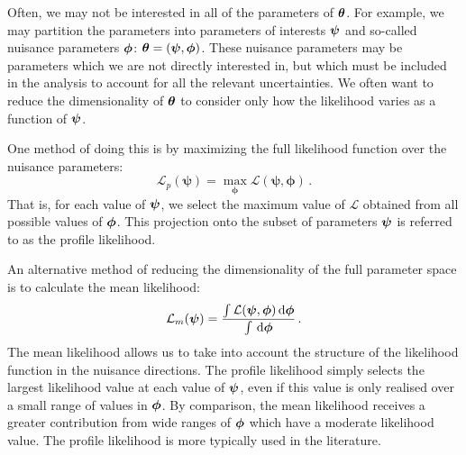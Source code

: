 Often, we may not be interested in all of the parameters of $\boldsymbol\theta$. For example, we may partition the parameters into parameters of interests $\boldsymbol\psi$ and so-called nuisance parameters $\boldsymbol\phi$: $\boldsymbol\theta = (\boldsymbol\psi, \boldsymbol\phi)$. These nuisance parameters may be parameters which we are not directly interested in, but which must be included in the analysis to account for all the relevant uncertainties. We often want to reduce the dimensionality of $\boldsymbol\theta$ to consider only how the likelihood varies as a function of $\boldsymbol\psi$.

One method of doing this is by maximizing the full likelihood function over the nuisance parameters:
\begin{equation}
\label{eq:parameter:profilelikelihood}
\mathcal{L}_p(\boldsymbol{\psi}) = \max_{\boldsymbol{\phi}} \mathcal{L}(\boldsymbol{\psi},\boldsymbol{\phi})\,.
\end{equation}
That is, for each value of $\boldsymbol\psi$, we select the maximum value of $\mathcal{L}$ obtained from all possible values of $\boldsymbol\phi$. This projection onto the subset of parameters $\boldsymbol\psi$ is referred to as the profile likelihood.

An alternative method of reducing the dimensionality of the full parameter space is to calculate the mean likelihood:
\begin{equation}
\label{eq:parameter:meanlikelihood}
\mathcal{L}_m(\boldsymbol{\psi}) = \frac{\int \mathcal{L}(\boldsymbol\psi, \boldsymbol\phi) \, \mathrm{d}\boldsymbol\phi}{\int \, \mathrm{d}\boldsymbol\phi}\,.
\end{equation}
The mean likelihood allows us to take into account the structure of the likelihood function in the nuisance directions. The profile likelihood simply selects the largest likelihood value at each value of $\boldsymbol\psi$, even if this value is only realised over a small range of values in $\boldsymbol\phi$. By comparison, the mean likelihood receives a greater contribution from wide ranges of $\boldsymbol\phi$ which have a moderate likelihood value. The profile likelihood is more typically used in the literature.

